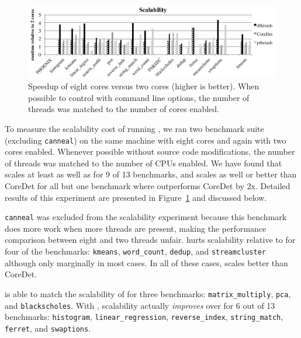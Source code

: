 \label{sec:scalability}

\begin{figure}
{\centering
\includegraphics[width=5in]{dthreads/figure/scalability-figure}
\caption{Speedup of eight cores versus two cores (higher is better).  When possible to control with command line options, the number of threads was matched to the number of cores enabled.\label{fig:scalability}}
}
\end{figure}

To measure the scalability cost of running \dthreads{}, we ran two benchmark suite (excluding \texttt{canneal}) on the same machine with eight cores and again with two cores enabled.  Whenever possible without source code modifications, the number of threads was matched to the number of CPUs enabled.  We have found that \dthreads{} scales at least as well as \pthreads{} for 9 of 13 benchmarks, and scales as well or better than CoreDet for all but one benchmark where \dthreads{} outperforms CoreDet by 2x.  Detailed results of this experiment are presented in Figure~\ref{fig:scalability} and discussed below.

\texttt{canneal} was excluded from the scalability experiment because this benchmark does more work when more threads are present, making the performance comparison between eight and two threads unfair.  \dthreads{} hurts scalability relative to \pthreads{} for four of the benchmarks: \texttt{kmeans}, \texttt{word\_count}, \texttt{dedup}, and \texttt{streamcluster} although only marginally in most cases.  In all of these cases, \dthreads{} scales better than CoreDet.

\dthreads{} is able to match the scalability of \pthreads{} for three benchmarks: \texttt{matrix\_multiply}, \texttt{pca}, and \texttt{blackscholes}.  With \dthreads{}, scalability actually \emph{improves} over \pthreads{} for 6 out of 13 benchmarks: \texttt{histogram}, \texttt{linear\_regression}, \texttt{reverse\_index}, \texttt{string\_match}, \texttt{ferret}, and \texttt{swaptions}.

